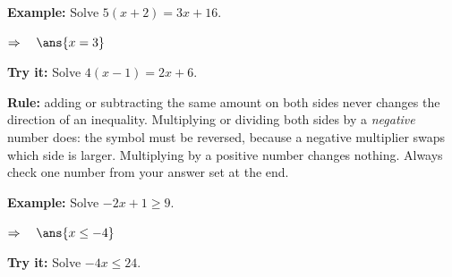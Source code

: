 \documentclass[12pt]{article}
\begin{document}
\begin{examplebox}
\textbf{Example:} \quad Solve $5(x + 2) = 3x + 16$.

$\Rightarrow\quad \ans{x = 3}$
\end{examplebox}

\begin{tryitbox}
\textbf{Try it:} \quad Solve $4(x - 1) = 2x + 6$.\\[2pt]
\end{tryitbox}


\begin{formulabox}
\textbf{Rule:} adding or subtracting the same amount on both sides never changes the direction of an
inequality. Multiplying or dividing both sides by a \emph{negative} number does: the symbol must be
reversed, because a negative multiplier swaps which side is larger. Multiplying by a positive number
changes nothing. Always check one number from your answer set at the end.
\end{formulabox}

\begin{examplebox}
\textbf{Example:} \quad Solve $-2x + 1 \ge 9$.

$\Rightarrow\quad \ans{x \le -4}$
\end{examplebox}

\begin{tryitbox}
\textbf{Try it:} \quad Solve $-4x \le 24$.\\[2pt]
\end{tryitbox}
\end{document}
